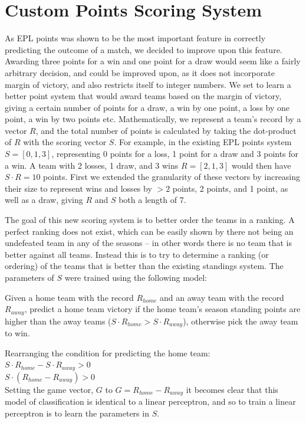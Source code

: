 \documentclass[conference]{IEEEtran}
\begin{document}
\section{Custom Points Scoring System}
As EPL points was shown to be the most important feature in correctly predicting the outcome of a match, we decided to improve upon this feature. Awarding three points for a win and one point for a draw would seem like a fairly arbitrary decision, and could be improved upon, as it does not incorporate margin of victory, and also restricts itself to integer numbers. We set to learn a better point system that would award teams based on the margin of victory, giving a certain number of points for a draw, a win by one point, a loss by one point, a win by two points etc. Mathematically, we represent a team's record by a vector $R$, and the total number of points is calculated by taking the dot-product of $R$ with the scoring vector $S$. For example, in the existing EPL points system $S=[0, 1, 3]$, representing 0 points for a loss, 1 point for a draw and 3 points for a win. A team with 2 losses, 1 draw, and 3 wins $R = [2,1,3]$ would then have $S \cdot R = 10$ points. First we extended the granularity of these vectors by increasing their size to represent wins and losses by $>2$ points, 2 points, and 1 point, as well as a draw, giving $R$ and $S$ both a length of 7. 

The goal of this new scoring system is to better order the teams in a ranking. A perfect ranking does not exist, which can be easily shown by there not being an undefeated team in any of the seasons -- in other words there is no team that is better against all teams. Instead this is to try to determine a ranking (or ordering) of the teams that is better than the existing standings system. The parameters of $S$ were trained using the following model:

Given a home team with the record $R_{home}$ and an away team with the record $R_{away}$, predict a home team victory if the home team's season standing points are higher than the away teams ($S \cdot R_{home} > S \cdot R_{away}$), otherwise pick the away team to win.

Rearranging the condition for predicting the home team:\\$S \cdot R_{home} - S \cdot R_{away} > 0$\\
$S \cdot (R_{home} - R_{away} ) > 0 $\\
Setting the game vector, $G$ to $G = R_{home} - R_{away}$ it becomes clear that this model of classification is identical to a linear perceptron, and so to train a linear perceptron is to learn the parameters in $S$. 
\end{document}

